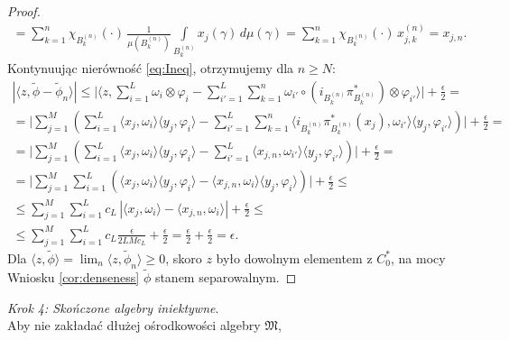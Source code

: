 \begin{proof}
\begin{eqnarray}
=\sum \limits_{k=1}^{n} \chi_{B_{k}^{(n)}}(\cdot) \,
\frac{1}{\mu(B_{k}^{(n)})}
\int \limits_{B_{k}^{(n)}} x_{j}(\gamma) \, d\mu(\gamma)
=\sum \limits_{k=1}^{n} \chi_{B_{k}^{(n)}}(\cdot) \,
x_{j,k}^{(n)}=x_{j,n}.
\end{eqnarray}
Kontynuując nierówność \eqref{eq:Ineq}, otrzymujemy dla $n \geq N$:
\begin{multline}
|\langle z, \tilde{\phi} - \tilde{\phi}_{n} \rangle|\leq \Big |\langle z,
\sum \limits_{i=1}^{L} \omega_{i} \otimes \varphi_{i} -\sum \limits_{i'=1}^{L}
\sum \limits_{k=1}^{n}\omega_{i'} \circ (i_{B_{k}^{(n)}} \pi^{*}_{B_{k}^{(n)}})
\otimes \varphi_{i'}\rangle \Big | + \frac{\epsilon}{2} =\\
= \Big |  \sum \limits_{j=1}^{M}\left( \sum \limits_{i =1}^{L}
\langle x_{j}, \omega_{i} \rangle \langle y_{j}, \varphi_{i} \rangle -
\sum \limits_{i'=1}^{L} \sum \limits_{k=1}^{n}
\langle i_{B_{k}^{(n)}} \pi^{*}_{B_{k}^{(n)}} (x_{j}) ,
\omega_{i'} \rangle \langle y_{j}, \varphi_{i'} \rangle
\right) \Big |  + \frac{\epsilon}{2} =\\
= \Big | \sum \limits_{j=1}^{M}\left( \sum \limits_{i=1}^{L}
\langle x_{j}, \omega_{i} \rangle \langle y_{j}, \varphi_{i} \rangle  -
\sum \limits_{i'=1}^{L}\langle x_{j,n} , \omega_{i'} \rangle \langle y_{j}, \varphi_{i'} \rangle
\right) \Big |  + \frac{\epsilon}{2} =\\
= \Big | \sum \limits_{j=1}^{M} \sum \limits_{i=1}^{L}
\left(\langle x_{j}, \omega_{i} \rangle \langle y_{j}, \varphi_{i} \rangle  -
\langle x_{j,n} , \omega_{i} \rangle \langle y_{j}, \varphi_{i} \rangle
\right) \Big |  + \frac{\epsilon}{2} \leq \\
\leq \sum \limits_{j=1}^{M} \sum \limits_{i=1}^{L}
c_{L}  \, \left | \langle    x_{j}, \omega_{i} \rangle -
\langle x_{j,n} , \omega_{i} \rangle\right | + \frac{\epsilon}{2} \leq \\
\leq \sum \limits_{j=1}^{M} \sum \limits_{i=1}^{L}
c_{L}  \frac{\epsilon}{2 L M c_{L}}     + \frac{\epsilon}{2}
=  \frac{\epsilon}{2} +  \frac{\epsilon}{2} =  \epsilon.
\end{multline}
Dla  $\langle z , \tilde{\phi} \rangle  =
\lim_{n} \langle z , \tilde{\phi}_{n} \rangle \geq 0$,
skoro $z$ było dowolnym elementem z $C_{0}^{*}$,
na mocy Wniosku \ref{cor:denseness} $\tilde{\phi}$ stanem separowalnym.
\end{proof}
{\it Krok 4: Skończone algebry iniektywne}.\\
Aby nie zakładać dłużej ośrodkowości algebry $\mathfrak{M}$,
